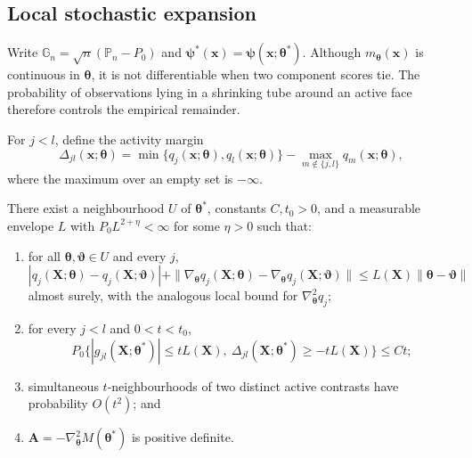 \subsection{Local stochastic expansion}

Write $\mathbb G_n=\sqrt n(\mathbb P_n-P_0)$ and
$\boldsymbol{\psi}^*(\mathbf{x})=\boldsymbol{\psi}(\mathbf{x};\boldsymbol{\theta}^*)$.  Although $m_{\boldsymbol{\theta}}(\mathbf{x})$ is continuous in
$\boldsymbol{\theta}$, it is not differentiable when two component scores tie.  The
probability of observations lying in a shrinking tube around an active face
therefore controls the empirical remainder.

For $j<l$, define the activity margin
\begin{equation}
 \Delta_{jl}(\mathbf{x};\boldsymbol{\theta})
 =\min\{q_j(\mathbf{x};\boldsymbol{\theta}),q_l(\mathbf{x};\boldsymbol{\theta})\}
  -\max_{m\notin\{j,l\}}q_m(\mathbf{x};\boldsymbol{\theta}),
 \label{eq:activity-margin}
\end{equation}
where the maximum over an empty set is $-\infty$.

\begin{assumption}
\label{ass:local-stochastic}
There exist a neighbourhood $U$ of $\boldsymbol{\theta}^*$, constants
$C,t_0>0$, and a measurable envelope $L$ with
$P_0L^{2+\eta}<\infty$ for some $\eta>0$ such
that:
\begin{enumerate}
 \item for all $\boldsymbol{\theta},\boldsymbol{\vartheta}\in U$ and every $j$,
 \[
  |q_j(\mathbf{X};\boldsymbol{\theta})-q_j(\mathbf{X};\boldsymbol{\vartheta})|
  +\|\nabla_{\boldsymbol{\theta}}q_j(\mathbf{X};\boldsymbol{\theta})-\nabla_{\boldsymbol{\theta}}q_j(\mathbf{X};\boldsymbol{\vartheta})\|
  \leq L(\mathbf{X})\|\boldsymbol{\theta}-\boldsymbol{\vartheta}\|
 \]
 almost surely, with the analogous local bound for $\nabla_{\boldsymbol{\theta}}^2q_j$;
 \item for every $j<l$ and $0<t<t_0$,
 \[
  P_0\{|g_{jl}(\mathbf{X};\boldsymbol{\theta}^*)|\leq tL(\mathbf{X}),\
          \Delta_{jl}(\mathbf{X};\boldsymbol{\theta}^*)\geq-tL(\mathbf{X})\}\leq Ct;
 \]
 \item simultaneous $t$-neighbourhoods of two distinct active contrasts have
 probability $O(t^2)$; and
 \item $\mathbf{A}=-\nabla_{\boldsymbol{\theta}}^2M(\boldsymbol{\theta}^*)$ is positive definite.
\end{enumerate}
\end{assumption}

